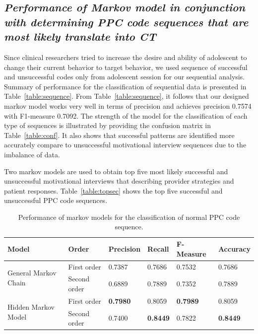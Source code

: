 \documentclass{amia}
\begin{document}
\subsection*{\textit{Performance of Markov model in conjunction with determining PPC code sequences that are most likely translate into CT}}
Since clinical researchers tried to increase the desire and ability of adolescent to change their current behavior to target behavior, we used sequence of successful and unsuccessful codes only from adolescent session for our sequential analysis. Summary of performance for the classification of sequential data is presented in Table~\ref{table:sequence}. From Table~\ref{table:sequence}, it follows that our designed markov model works very well in terms of precision and achieves precision 0.7574 with F1-measure 0.7092. The strength of the model for the classification of each type of sequences is illustrated by providing the confusion matrix in Table~\ref{table:conf}. It also shows that successful patterns are identified more accurately compare to unsuccessful motivational interview sequences due to the imbalance of data.

Two markov models are used to obtain top five most likely successful and unsuccessful motivational interviews that describing provider strategies and patient responses. Table~\ref{table:topsec} shows the top five successful and unsuccessful PPC code sequences. \\

\begin{table}[h]
\centering
\caption{Performance of markov models for the classification of normal PPC code sequence.}
\label{tab:result_norm_seq}
  \begin{tabular}{|l|l|l|l|l|l|}
  \hline
   \textbf{Model} & \textbf{Order}  & \textbf{Precision}  & \textbf{Recall} & \textbf{F-Measure} & \textbf{Accuracy}\\ \hline    
    
 \multirow{2}{*}{General Markov Chain} & First order & 0.7387 & 0.7686 & 0.7532 & 0.7686\\\cline{2-6}
 & Second order & 0.6889 & 0.7889 & 0.7352 & 0.7889\\ \hline
 \multirow{2}{*}{Hidden Markov Model} & First order & \textbf{0.7980} & 0.8059 & \textbf{0.7989} & 0.8059\\ \cline{2-6}
 & Second order & 0.7400 & \textbf{0.8449} & 0.7822  & \textbf{0.8449}\\ \hline
 
  \end{tabular}
\end{table}
\end{document}
